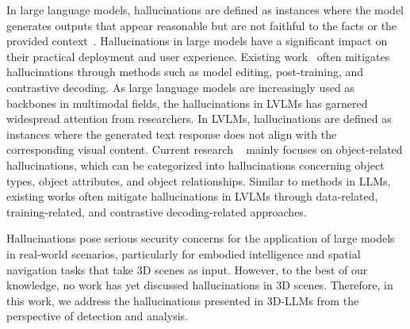 In large language models, hallucinations are defined as instances where the model generates outputs that appear reasonable but are not faithful to the facts or the provided context~\cite{filippova-2020-controlled}. Hallucinations in large models have a significant impact on their practical deployment and user experience. Existing work~\cite{leng2024mitigating, liu2023mitigating, yu2024hallucidoctor, zhai2023halle} often mitigates hallucinations through methods such as model editing, post-training, and contrastive decoding. As large language models are increasingly used as backbones in multimodal fields, the hallucinations in LVLMs has garnered widespread attention from researchers. In LVLMs, hallucinations are defined as instances where the generated text response does not align with the corresponding visual content. Current research ~\cite{rohrbach2018object, li2023evaluating, hu2023ciem} mainly focuses on object-related hallucinations, which can be categorized into hallucinations concerning object types, object attributes, and object relationships. Similar to methods in LLMs, existing works often mitigate hallucinations in LVLMs through data-related, training-related, and contrastive decoding-related approaches.

Hallucinations pose serious security concerns for the application of large models in real-world scenarios, particularly for embodied intelligence and spatial navigation tasks that take 3D scenes as input. However, to the best of our knowledge, no work has yet discussed hallucinations in 3D scenes. Therefore, in this work, we address the hallucinations presented in 3D-LLMs from the perspective of detection and analysis.
